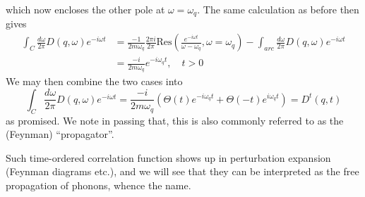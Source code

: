 which now encloses the other pole at $\omega=\omega_q$. The same calculation as before then gives
\begin{align*}
    \int_C{\frac{d\omega}{2\pi}D\left( q,\omega \right) e^{-i\omega t}}&=\frac{-1}{2m\omega _q}\frac{2\pi i}{2\pi}\mathrm{Res}\left( \frac{e^{-i\omega t}}{\omega -\omega _q},\omega =\omega _q \right) -\int_{arc}{\frac{d\omega}{2\pi}D\left( q,\omega \right) e^{-i\omega t}}\\
    &=\frac{-i}{2m\omega _q}e^{-i\omega _qt},\quad t>0
\end{align*}
We may then combine the two cases into
\[ \int_C{\frac{d\omega}{2\pi}D\left( q,\omega \right) e^{-i\omega t}}=\frac{-i}{2m\omega _q}\left( \Theta \left( t \right) e^{-i\omega _qt}+\Theta \left( -t \right) e^{i\omega _qt} \right) =D^t\left( q,t \right) \]
as promised. We note in passing that, this is also commonly referred to as the (Feynman) ``propagator''.

Such time-ordered correlation function shows up in perturbation expansion (Feynman diagrams etc.), and we will see that they can be interpreted as the free propagation of phonons, whence the name.

